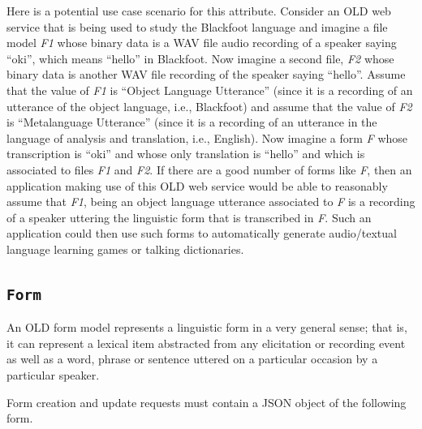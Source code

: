 \documentclass[letterpaper,10pt,english]{sphinxmanual}
\begin{document}
Here is a potential use case scenario for this attribute.  Consider an OLD web
service that is being used to study the Blackfoot language and imagine a file
model \emph{F1} whose binary data is a WAV file audio recording of a speaker saying
``oki'', which means ``hello'' in Blackfoot.  Now imagine a second file, \emph{F2} whose
binary data is another WAV file recording of the speaker saying ``hello''.  Assume
that the  value of \emph{F1} is ``Object Language Utterance'' (since
it is a recording of an utterance of the object language, i.e., Blackfoot) and
assume that the  value of \emph{F2} is ``Metalanguage Utterance''
(since it is a recording of an utterance in the language of analysis and
translation, i.e., English).  Now imagine a form \emph{F} whose transcription is
``oki'' and whose only translation is ``hello'' and which is associated to files
\emph{F1} and \emph{F2}.  If there are a good number of forms like \emph{F}, then an
application making use of this OLD web service would be able to reasonably
assume that \emph{F1}, being an object language utterance associated to \emph{F} is a
recording of a speaker uttering the linguistic form that is transcribed in \emph{F}.
Such an application could then use such forms to automatically generate
audio/textual language learning games or talking dictionaries.


\subsection{\texttt{Form}}
\label{datastructure:form-data-structure}\label{datastructure:form}
An OLD form model represents a linguistic form in a very general sense; that is,
it can represent a lexical item abstracted from any elicitation or recording
event as well as a word, phrase or sentence uttered on a particular occasion
by a particular speaker.

Form creation and update requests must contain a JSON object of the following
form.
\end{document}
